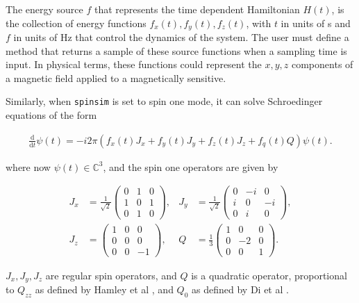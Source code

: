 \documentclass{jors}
\begin{document}
			The energy source \(f\) that represents the time dependent Hamiltonian \(H(t)\), is the collection of energy functions \(f_x(t), f_y(t), f_z(t)\), with \(t\) in units of s and \(f\) in units of Hz that control the dynamics of the system. The user must define a method that returns a sample of these source functions when a sampling time is input. In physical terms, these functions could represent the \(x,y,z\) components of a magnetic field applied to a magnetically sensitive.

			Similarly, when \texttt{spinsim} is set to spin one mode, it can solve Schroedinger equations of the form

			\begin{align*}
				\frac{\mathrm{d}}{\mathrm{d}t}\psi(t) = -i 2\pi (f_x(t) J_x + f_y(t) J_y + f_z(t) J_z + f_q(t) Q) \psi(t).
			\end{align*}

			where now \(\psi(t) \in \mathbb{C}^3\), and the spin one operators are given by

			\begin{align*}
				J_x &= \frac{1}{\sqrt{2}}\begin{pmatrix}
					0 & 1 & 0 \\
					1 & 0 & 1 \\
					0 & 1 & 0
				\end{pmatrix},&
				J_y &= \frac{1}{\sqrt{2}}\begin{pmatrix}
					0 & -i &  0 \\
					i &  0 & -i \\
					0 &  i &  0
				\end{pmatrix},\\
				J_z &= \begin{pmatrix}
					1 & 0 &  0 \\
					0 & 0 &  0 \\
					0 & 0 & -1
				\end{pmatrix},&
				Q &= \frac{1}{3}\begin{pmatrix}
					1 &  0 & 0 \\
					0 & -2 & 0 \\
					0 &  0 & 1
				\end{pmatrix}.
			\end{align*}

			\(J_x, J_y, J_z\) are regular spin operators, and \(Q\) is a quadratic operator, proportional to \(Q_{zz}\) as defined by Hamley et al \cite{hamley_spin-nematic_2012}, and \(Q_0\) as defined by Di et al \cite{di_dipolequadrupole_2010}.
\end{document}
